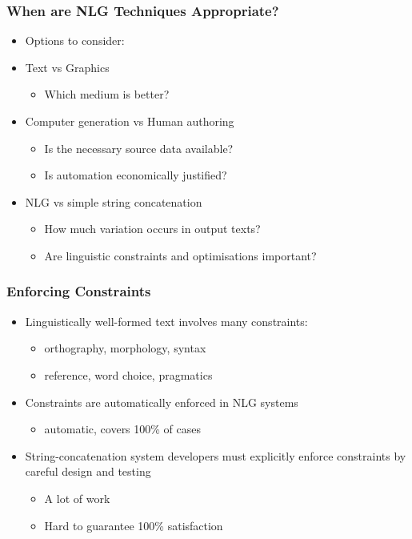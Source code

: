 \documentclass[compress,color=usenames]{beamer}
\begin{document}
\begin{frame}
\frametitle{When are NLG Techniques Appropriate?}

\label{f44}
\begin{itemize}
\item { {Options to consider:}}
\item { {Text vs Graphics}}
\begin{itemize}
\item Which medium is better?
\end{itemize}
\item { {Computer generation vs Human authoring}}
\begin{itemize}
\item Is the necessary source data available?
\item Is automation economically justified?
\end{itemize}
\item { {NLG vs simple string concatenation}}
\begin{itemize}
\item How much variation occurs in output texts?
\item Are linguistic constraints and optimisations important?
\end{itemize}
\end{itemize}

\end{frame}

\begin{frame}
\frametitle{Enforcing Constraints}

\label{f46}
\begin{itemize}
\item { {Linguistically well-formed text involves many constraints:}}
\begin{itemize}
\item orthography, morphology, syntax
\item reference, word choice, pragmatics
\end{itemize}
\item { {Constraints are automatically enforced in NLG systems}}
\begin{itemize}
\item automatic, covers 100\% of cases
\end{itemize}
\item { {String-concatenation system developers must explicitly enforce constraints by careful design and testing}}
\begin{itemize}
\item A lot of work
\item Hard to guarantee 100\% satisfaction
\end{itemize}
\end{itemize}

\end{frame}
\end{document}
